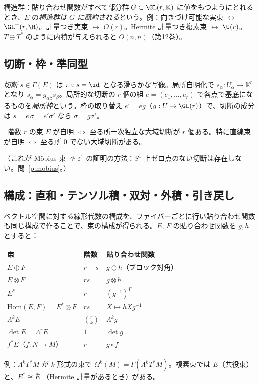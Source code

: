 構造群：貼り合わせ関数がすべて部分群 $G\subset\GL(r,\mathbb K)$ に値をもつようにとれるとき、$E$ の\emph{構造群は $G$ に簡約される}という。例：向きづけ可能な実束 $\leftrightarrow$ $\GL^+(r,\R)$。計量つき実束 $\leftrightarrow$ $O(r)$。Hermite 計量つき複素束 $\leftrightarrow$ $\U(r)$。$T\oplus T^*$ のように内積が与えられると $O(n,n)$（第12巻）。

\subsection{切断・枠・準同型}
\emph{切断} $s\in\Gamma(E)$ は $\pi\circ s=\id$ となる滑らかな写像。局所自明化で $s_\alpha:U_\alpha\to\mathbb K^r$ となり $s_\alpha=g_{\alpha\beta}s_\beta$。局所的な切断の $r$ 個の組 $e=(e_1,\dots,e_r)$ で各点で基底になるものを\emph{局所枠}という。枠の取り替え $e'=eg$（$g:U\to\GL(r)$）で、切断の成分は $s=e\,\sigma=e'\sigma'$ なら $\sigma=g\sigma'$。

\begin{prop}\label{prop:trivial}\tC\
階数 $r$ の束 $E$ が自明 $\Leftrightarrow$ 至る所一次独立な大域切断が $r$ 個ある。特に直線束が自明 $\Leftrightarrow$ 至る所 $0$ でない大域切断がある。
\end{prop}
（これが Möbius 束 $\not\simeq\varepsilon^1$ の証明の方法：$S^1$ 上ゼロ点のない切断は存在しない。問~\ref{p:mobius}。）

\subsection{構成：直和・テンソル積・双対・外積・引き戻し}
ベクトル空間に対する線形代数の構成を、ファイバーごとに行い貼り合わせ関数も同じ構成で作ることで、束の構成が得られる。$E$, $F$ の貼り合わせ関数を $g,h$ とすると：
\begin{center}
\begin{tabular}{lll}
\toprule
束 & 階数 & 貼り合わせ関数\\
\midrule
$E\oplus F$ & $r+s$ & $g\oplus h$（ブロック対角）\\
$E\otimes F$ & $rs$ & $g\otimes h$\\
$E^*$ & $r$ & $(g^{-1})^T$\\
$\mathrm{Hom}(E,F)=E^*\otimes F$ & $rs$ & $X\mapsto hXg^{-1}$\\
$\Lambda^kE$ & $\binom rk$ & $\Lambda^kg$\\
$\det E=\Lambda^rE$ & $1$ & $\det g$\\
$f^*E$（$f:N\to M$） & $r$ & $g\circ f$\\
\bottomrule
\end{tabular}
\end{center}
例：$\Lambda^kT^*M$ が $k$ 形式の束で $\Omega^k(M)=\Gamma(\Lambda^kT^*M)$。複素束では $\bar E$（共役束）と、$E^*\cong\bar E$ （Hermite 計量があるとき）がある。

